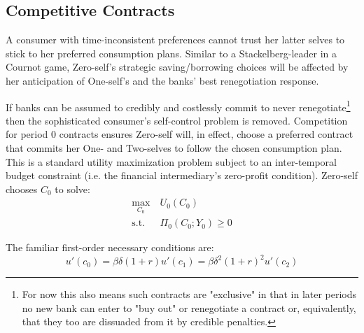 \documentclass[11pt,english]{article}
\theoremstyle{plain}
\theoremstyle{definition}
\begin{document}
\subsection{ Competitive Contracts}

\label{sec-FCC} A consumer with time-inconsistent preferences cannot
trust her latter selves to stick to her preferred consumption plans.
Similar to a Stackelberg-leader in a Cournot game, Zero-self's strategic
saving/borrowing choices will be affected by her anticipation of One-self's
and the banks' best renegotiation response. 

If banks can be assumed to credibly and costlessly commit to never
renegotiate\footnote{ For now this also means such contracts are "exclusive" in
that in later periods no new bank can enter to "buy out"
or renegotiate a contract or, equivalently, that they too are dissuaded
from it by credible penalties. } then the sophisticated consumer's self-control problem is removed.
Competition for period 0 contracts ensures Zero-self will, in
effect, choose a preferred contract that commits her One- and Two-selves
to follow the chosen consumption plan. This is a standard utility
maximization problem subject to an inter-temporal budget constraint
(i.e. the financial intermediary's zero-profit condition). Zero-self
chooses $C_{0}$ to solve: 
\begin{align}
\max_{C_{0}} & \ U_{0}(C_{0})\label{eq:cobj0}\\
\text{s.t.} & \ \Pi_{0}(C_{0};Y_{0})\geq0\label{eq:BPC0}
\end{align}


The familiar first-order necessary conditions are: 
\begin{equation}
u'\left(c_{0}\right)=\beta\delta(1+r)u'\left(c_{1}\right)=\beta\delta^{2}(1+r)^{2}u'\left(c_{2}\right)
\end{equation}
\end{document}
